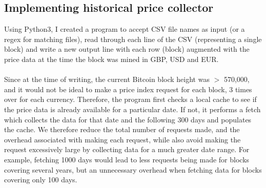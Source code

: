 \subsection{Implementing historical price collector}
Using Python3, I created a program to accept CSV file names as input (or a regex for matching files), read through each line of the CSV (representing a single block) and write a new output line with each row (block) augmented with the price data at the time the block was mined in GBP, USD and EUR. 
\\\\
Since at the time of writing, the current Bitcoin block height was $>$ 570,000, and it would not be ideal to make a price index request for each block, 3 times over for each currency. Therefore, the program first checks a local cache to see if the price data is already available for a particular date. If not, it performs a fetch which collects the data for that date and the following 300 days and populates the cache. We therefore reduce the total number of requests made, and the overhead associated with making each request, while also avoid making the request excessively large by collecting data for a much greater date range. For example, fetching 1000 days would lead to less requests being made for blocks covering several years, but an unnecessary overhead when fetching data for blocks covering only 100 days.